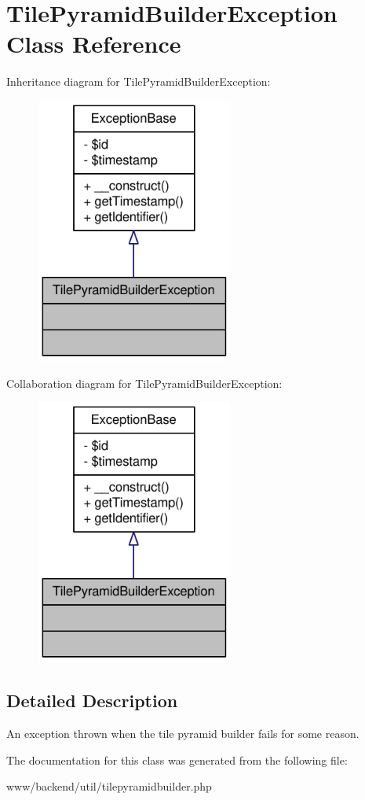 \hypertarget{classTilePyramidBuilderException}{
\section{TilePyramidBuilderException Class Reference}
\label{classTilePyramidBuilderException}
}


Inheritance diagram for TilePyramidBuilderException:\nopagebreak
\begin{figure}[H]
\begin{center}
\leavevmode
\includegraphics[width=184pt]{classTilePyramidBuilderException__inherit__graph}
\end{center}
\end{figure}


Collaboration diagram for TilePyramidBuilderException:\nopagebreak
\begin{figure}[H]
\begin{center}
\leavevmode
\includegraphics[width=184pt]{classTilePyramidBuilderException__coll__graph}
\end{center}
\end{figure}


\subsection{Detailed Description}
An exception thrown when the tile pyramid builder fails for some reason. 

The documentation for this class was generated from the following file:\begin{DoxyCompactItemize}
\item 
www/backend/util/tilepyramidbuilder.php\end{DoxyCompactItemize}
